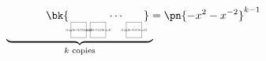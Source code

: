 \documentclass{article}
\newcommand{\jonesd}[1][every node/.style={scale=.5}]{%
  \raisebox{-1.9em}{\begin{tikzpicture}[#1]%
      \pgfdeclareimage{jd}{single-circle.pdf}
      \node (jd) at (0,0) {\pgfuseimage{jd}};
    \end{tikzpicture}}%
}
\begin{document}
$\displaystyle \bk{\jonesd{} \jonesd{} \cdots \jonesd{}} =
\text{$\pn{-x^2 - x^{-2}}^{k-1}$}
\hspace{-23.0em}\raisebox{-1.75em}{$\underbrace{\hspace{13.25em}}_{k
    \text{ copies}}$}$
\end{document}

